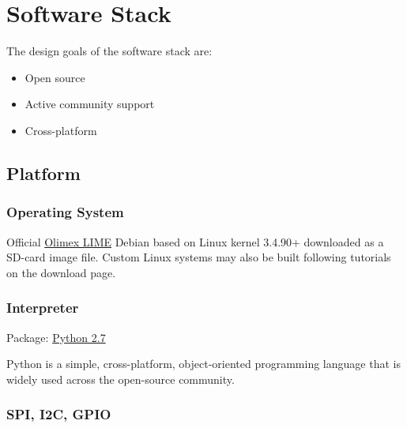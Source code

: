 \usepackage{listings}
\usepackage{color}




\section{Software Stack}

The design goals of the software stack are:
\begin{itemize}
\item Open source
\item Active community support
\item Cross-platform
\end{itemize}

\subsection{Platform}
\subsubsection{Operating System}
Official \href{https://www.olimex.com/wiki/A20-OLinuXino-LIME#How_to_generate_boot-able_SD-card_Debian_Linux_image_for_A20-OLinuXino-LIME.3F}{Olimex LIME} Debian based on Linux kernel 3.4.90+ downloaded as a SD-card image file. Custom Linux systems may also be built following tutorials on the download page.

\subsubsection{Interpreter}

Package:	\href{https://www.python.org/downloads/release/python-279/}{Python 2.7}

Python is a simple, cross-platform, object-oriented programming language that is widely used across the open-source community.

\subsubsection{SPI, I2C, GPIO}
	
